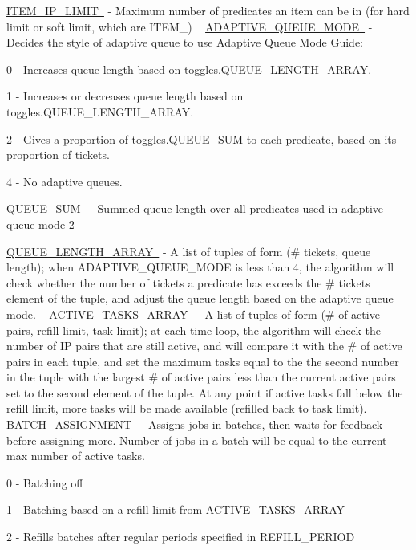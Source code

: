 \mbox{\hyperlink{}{I\+T\+E\+M\+\_\+\+I\+P\+\_\+\+L\+I\+M\+IT }} -\/ Maximum number of predicates an item can be in (for hard limit or soft limit, which are I\+T\+E\+M\+\_\+) ~\newline
 \mbox{\hyperlink{}{A\+D\+A\+P\+T\+I\+V\+E\+\_\+\+Q\+U\+E\+U\+E\+\_\+\+M\+O\+DE }} -\/ Decides the style of adaptive queue to use Adaptive Queue Mode Guide\+:
\begin{DoxyItemize}
\item 0 -\/ Increases queue length based on toggles.\+Q\+U\+E\+U\+E\+\_\+\+L\+E\+N\+G\+T\+H\+\_\+\+A\+R\+R\+AY.
\item 1 -\/ Increases or decreases queue length based on toggles.\+Q\+U\+E\+U\+E\+\_\+\+L\+E\+N\+G\+T\+H\+\_\+\+A\+R\+R\+AY.
\item 2 -\/ Gives a proportion of toggles.\+Q\+U\+E\+U\+E\+\_\+\+S\+UM to each predicate, based on its proportion of tickets.
\item 4 -\/ No adaptive queues.
\end{DoxyItemize}

\mbox{\hyperlink{}{Q\+U\+E\+U\+E\+\_\+\+S\+UM }} -\/ Summed queue length over all predicates used in adaptive queue mode 2

\mbox{\hyperlink{}{Q\+U\+E\+U\+E\+\_\+\+L\+E\+N\+G\+T\+H\+\_\+\+A\+R\+R\+AY }} -\/ A list of tuples of form (\# tickets, queue length); when A\+D\+A\+P\+T\+I\+V\+E\+\_\+\+Q\+U\+E\+U\+E\+\_\+\+M\+O\+DE is less than 4, the algorithm will check whether the number of tickets a predicate has exceeds the \# tickets element of the tuple, and adjust the queue length based on the adaptive queue mode. ~\newline
 \mbox{\hyperlink{}{A\+C\+T\+I\+V\+E\+\_\+\+T\+A\+S\+K\+S\+\_\+\+A\+R\+R\+AY }} -\/ A list of tuples of form (\# of active pairs, refill limit, task limit); at each time loop, the algorithm will check the number of IP pairs that are still active, and will compare it with the \# of active pairs in each tuple, and set the maximum tasks equal to the the second number in the tuple with the largest \# of active pairs less than the current active pairs set to the second element of the tuple. At any point if active tasks fall below the refill limit, more tasks will be made available (refilled back to task limit). ~\newline
 \mbox{\hyperlink{}{B\+A\+T\+C\+H\+\_\+\+A\+S\+S\+I\+G\+N\+M\+E\+NT }} -\/ Assigns jobs in batches, then waits for feedback before assigning more. Number of jobs in a batch will be equal to the current max number of active tasks.
\begin{DoxyItemize}
\item 0 -\/ Batching off
\item 1 -\/ Batching based on a refill limit from A\+C\+T\+I\+V\+E\+\_\+\+T\+A\+S\+K\+S\+\_\+\+A\+R\+R\+AY
\item 2 -\/ Refills batches after regular periods specified in R\+E\+F\+I\+L\+L\+\_\+\+P\+E\+R\+I\+OD
\end{DoxyItemize}

